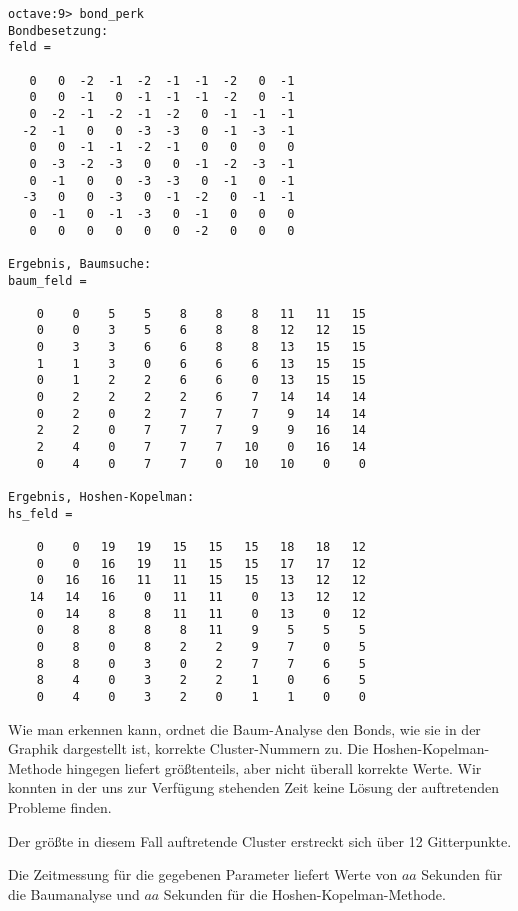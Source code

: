 \begin{lstlisting}[caption=Ausgabe von \lref{bond_perk},label=lst:output]
octave:9> bond_perk
Bondbesetzung:
feld =

   0   0  -2  -1  -2  -1  -1  -2   0  -1
   0   0  -1   0  -1  -1  -1  -2   0  -1
   0  -2  -1  -2  -1  -2   0  -1  -1  -1
  -2  -1   0   0  -3  -3   0  -1  -3  -1
   0   0  -1  -1  -2  -1   0   0   0   0
   0  -3  -2  -3   0   0  -1  -2  -3  -1
   0  -1   0   0  -3  -3   0  -1   0  -1
  -3   0   0  -3   0  -1  -2   0  -1  -1
   0  -1   0  -1  -3   0  -1   0   0   0
   0   0   0   0   0   0  -2   0   0   0

Ergebnis, Baumsuche:
baum_feld =

    0    0    5    5    8    8    8   11   11   15
    0    0    3    5    6    8    8   12   12   15
    0    3    3    6    6    8    8   13   15   15
    1    1    3    0    6    6    6   13   15   15
    0    1    2    2    6    6    0   13   15   15
    0    2    2    2    2    6    7   14   14   14
    0    2    0    2    7    7    7    9   14   14
    2    2    0    7    7    7    9    9   16   14
    2    4    0    7    7    7   10    0   16   14
    0    4    0    7    7    0   10   10    0    0

Ergebnis, Hoshen-Kopelman:
hs_feld =

    0    0   19   19   15   15   15   18   18   12
    0    0   16   19   11   15   15   17   17   12
    0   16   16   11   11   15   15   13   12   12
   14   14   16    0   11   11    0   13   12   12
    0   14    8    8   11   11    0   13    0   12
    0    8    8    8    8   11    9    5    5    5
    0    8    0    8    2    2    9    7    0    5
    8    8    0    3    0    2    7    7    6    5
    8    4    0    3    2    2    1    0    6    5
    0    4    0    3    2    0    1    1    0    0

\end{lstlisting}

Wie man erkennen kann, ordnet die Baum-Analyse den Bonds, wie sie in der Graphik dargestellt
ist, korrekte Cluster-Nummern zu. Die Hoshen-Kopelman-Methode hingegen liefert
größtenteils, aber nicht überall korrekte Werte. Wir konnten in der uns zur Verfügung stehenden
Zeit keine Lösung der auftretenden Probleme finden.

Der größte in diesem Fall auftretende Cluster erstreckt sich über 12 Gitterpunkte.

Die Zeitmessung für die gegebenen Parameter liefert Werte von $aa$ Sekunden für die
Baumanalyse und $aa$ Sekunden für die Hoshen-Kopelman-Methode.